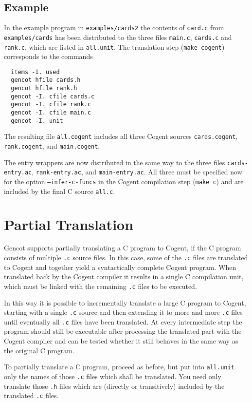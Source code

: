 \documentclass[a4paper]{report}
\newcommand{\code}[1]{\textnormal{\texttt{#1}}}
\begin{document}
\subsection{Example}

In the example program in \code{examples/cards2} the contents of \code{card.c} from \code{examples/cards} has been 
distributed to the three files \code{main.c}, \code{cards.c} and \code{rank.c}, which are listed in \code{all.unit}.
The translation step (\code{make cogent}) corresponds to the commands
\begin{verbatim}
  items -I. used
  gencot hfile cards.h
  gencot hfile rank.h
  gencot -I. cfile cards.c
  gencot -I. cfile rank.c
  gencot -I. cfile main.c
  gencot -I. unit
\end{verbatim}
The resulting file \code{all.cogent} includes all three Cogent sources \code{cards.cogent}, \code{rank.cogent}, and
\code{main.cogent}.

The entry wrappers are now distributed in the same way to the three files \code{cards-entry.ac}, \code{rank-entry.ac},
and \code{main-entry.ac}. All three must be specified now for the option
\code{--infer-c-funcs} in the Cogent compilation step (\code{make c}) and are included by the final C source
\code{all.c}.

\section{Partial Translation}
\label{struct-partial}

Gencot supports partially translating a C program to Cogent, if the C program consists of multiple \code{.c} source
files. In this case, some of the \code{.c} files are translated to Cogent and together yield a syntactically complete 
Cogent program. When translated back by the Cogent compiler it results in a single C compilation unit, which must be
linked with the remaining \code{.c} files to be executed.

In this way it is possible to incrementally translate a large C program to Cogent, starting with a single \code{.c} 
source and then extending it to more and more \code{.c} files until eventually all \code{.c} files have been translated.
At every intermediate step the program should still be executable after processing the translated part with the Cogent
compiler and can be tested whether it still behaves in the same way as the original C program.

To partially translate a C program, proceed as before, but put into \code{all.unit} only the names of those \code{.c}
files which shall be translated. You need only translate those \code{.h} files which are (directly or transitively)
included by the translated \code{.c} files. 
\end{document}
